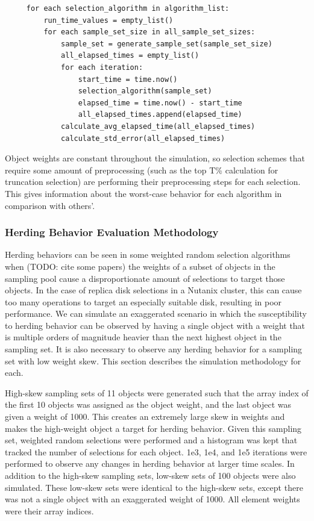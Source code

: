 \documentclass[12pt]{article}
\begin{document}
     \begin{verbatim}
     for each selection_algorithm in algorithm_list:
         run_time_values = empty_list()
         for each sample_set_size in all_sample_set_sizes:
             sample_set = generate_sample_set(sample_set_size)
             all_elapsed_times = empty_list()
             for each iteration:
                 start_time = time.now()
                 selection_algorithm(sample_set)
                 elapsed_time = time.now() - start_time
                 all_elapsed_times.append(elapsed_time)
             calculate_avg_elapsed_time(all_elapsed_times)
             calculate_std_error(all_elapsed_times)
     \end{verbatim}
        
    Object weights are constant throughout the simulation, so selection schemes
    that require some amount of preprocessing (such as the top T\% calculation
    for truncation selection) are performing their preprocessing steps for each
    selection. This gives information about the worst-case behavior for each
    algorithm in comparison with others'.

    \subsubsection{Herding Behavior Evaluation Methodology}
    Herding behaviors can be seen in some weighted random selection
    algorithms when (TODO: cite some papers) the weights of a subset of objects
    in the sampling pool cause a disproportionate amount of selections to
    target those objects. In the case of replica disk selections in a Nutanix
    cluster, this can cause too many operations to target an especially
    suitable disk, resulting in poor performance. We can simulate an
    exaggerated scenario in which the susceptibility to herding behavior can be
    observed by having a single object with a weight that is multiple orders of
    magnitude heavier than the next highest object in the sampling set. It is
    also necessary to observe any herding behavior for a sampling set with low
    weight skew. This section describes the simulation methodology for each.

    High-skew sampling sets of 11 objects were generated such that the array
    index of the first 10 objects was assigned as the object weight, and the
    last object was given a weight of 1000. This creates an extremely large
    skew in weights and makes the high-weight object a target for herding
    behavior. Given this sampling set, weighted random selections were
    performed and a histogram was kept that tracked the number of selections
    for each object. 1e3, 1e4, and 1e5 iterations were performed to observe any
    changes in herding behavior at larger time scales. In addition to the
    high-skew sampling sets, low-skew sets of 100 objects were also simulated.
    These low-skew sets were identical to the high-skew sets, except there was
    not a single object with an exaggerated weight of 1000. All element weights
    were their array indices.
\end{document}
